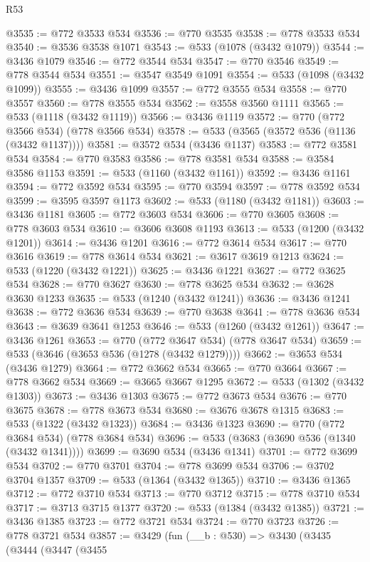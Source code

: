 \begin{lexlean}{R53}
\begin{coremodule}
@3535 := @772 @3533 @534
@3536 := @770 @3535
@3538 := @778 @3533 @534
@3540 := @3536 @3538 @1071
@3543 := @533 (@1078 (@3432 @1079))
@3544 := @3436 @1079
@3546 := @772 @3544 @534
@3547 := @770 @3546
@3549 := @778 @3544 @534
@3551 := @3547 @3549 @1091
@3554 := @533 (@1098 (@3432 @1099))
@3555 := @3436 @1099
@3557 := @772 @3555 @534
@3558 := @770 @3557
@3560 := @778 @3555 @534
@3562 := @3558 @3560 @1111
@3565 := @533 (@1118 (@3432 @1119))
@3566 := @3436 @1119
@3572 := @770 (@772 @3566 @534) (@778 @3566 @534)
@3578 := @533 (@3565 (@3572 @536 (@1136 (@3432 @1137))))
@3581 := @3572 @534 (@3436 @1137)
@3583 := @772 @3581 @534
@3584 := @770 @3583
@3586 := @778 @3581 @534
@3588 := @3584 @3586 @1153
@3591 := @533 (@1160 (@3432 @1161))
@3592 := @3436 @1161
@3594 := @772 @3592 @534
@3595 := @770 @3594
@3597 := @778 @3592 @534
@3599 := @3595 @3597 @1173
@3602 := @533 (@1180 (@3432 @1181))
@3603 := @3436 @1181
@3605 := @772 @3603 @534
@3606 := @770 @3605
@3608 := @778 @3603 @534
@3610 := @3606 @3608 @1193
@3613 := @533 (@1200 (@3432 @1201))
@3614 := @3436 @1201
@3616 := @772 @3614 @534
@3617 := @770 @3616
@3619 := @778 @3614 @534
@3621 := @3617 @3619 @1213
@3624 := @533 (@1220 (@3432 @1221))
@3625 := @3436 @1221
@3627 := @772 @3625 @534
@3628 := @770 @3627
@3630 := @778 @3625 @534
@3632 := @3628 @3630 @1233
@3635 := @533 (@1240 (@3432 @1241))
@3636 := @3436 @1241
@3638 := @772 @3636 @534
@3639 := @770 @3638
@3641 := @778 @3636 @534
@3643 := @3639 @3641 @1253
@3646 := @533 (@1260 (@3432 @1261))
@3647 := @3436 @1261
@3653 := @770 (@772 @3647 @534) (@778 @3647 @534)
@3659 := @533 (@3646 (@3653 @536 (@1278 (@3432 @1279))))
@3662 := @3653 @534 (@3436 @1279)
@3664 := @772 @3662 @534
@3665 := @770 @3664
@3667 := @778 @3662 @534
@3669 := @3665 @3667 @1295
@3672 := @533 (@1302 (@3432 @1303))
@3673 := @3436 @1303
@3675 := @772 @3673 @534
@3676 := @770 @3675
@3678 := @778 @3673 @534
@3680 := @3676 @3678 @1315
@3683 := @533 (@1322 (@3432 @1323))
@3684 := @3436 @1323
@3690 := @770 (@772 @3684 @534) (@778 @3684 @534)
@3696 := @533 (@3683 (@3690 @536 (@1340 (@3432 @1341))))
@3699 := @3690 @534 (@3436 @1341)
@3701 := @772 @3699 @534
@3702 := @770 @3701
@3704 := @778 @3699 @534
@3706 := @3702 @3704 @1357
@3709 := @533 (@1364 (@3432 @1365))
@3710 := @3436 @1365
@3712 := @772 @3710 @534
@3713 := @770 @3712
@3715 := @778 @3710 @534
@3717 := @3713 @3715 @1377
@3720 := @533 (@1384 (@3432 @1385))
@3721 := @3436 @1385
@3723 := @772 @3721 @534
@3724 := @770 @3723
@3726 := @778 @3721 @534
@3857 := @3429
    (fun (__b : @530) =>
    @3430
      (@3435
        (@3444
          (@3447
            (@3455

\end{coremodule}
\end{lexlean}
